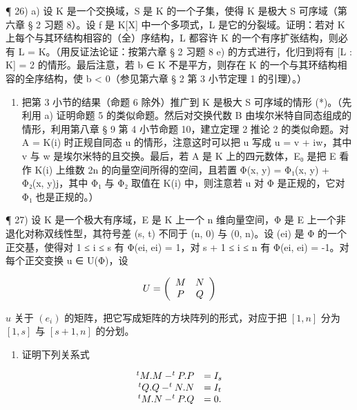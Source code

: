 ¶ 26) a) 设 K 是一个交换域，S 是 K 的一个子集，使得 K 是极大 S 可序域（第六章 § 2 习题 8）。设 f 是 K{[}X{]} 中一个多项式，L 是它的分裂域。证明：若对 K 上每个与其环结构相容的（全）序结构，L 都容许 K 的一个有序扩张结构，则必有 L = K。（用反证法论证：按第六章 § 2 习题 8 e) 的方式进行，化归到将有 {[}L : K{]} = 2 的情形。最后注意，若 b ∈ K 不是平方，则存在 K 的一个与其环结构相容的全序结构，使 b \textless{} 0（参见第六章 § 2 第 3 小节定理 1 的引理）。）

\begin{enumerate}
\def\labelenumi{\alph{enumi})}
\setcounter{enumi}{1}
\tightlist
\item
  把第 3 小节的结果（命题 6 除外）推广到 K 是极大 S 可序域的情形 (*)。（先利用 a) 证明命题 5 的类似命题。然后对交换代数 B 由埃尔米特自同态组成的情形，利用第八章 § 9 第 4 小节命题 10，建立定理 2 推论 2 的类似命题。对 A = K(i) 时正规自同态 u 的情形，注意这时可以把 u 写成 u = v + iw，其中 v 与 w 是埃尔米特的且交换。最后，若 A 是 K 上的四元数体，E₀ 是把 E 看作 K(i) 上维数 2n 的向量空间所得的空间，且若置 Φ(x, y) = Φ₁(x, y) + Φ₂(x, y)j，其中 Φ₁ 与 Φ₂ 取值在 K(i) 中，则注意若 u 对 Φ 是正规的，它对 Φ₁ 也是正规的。）
\end{enumerate}

¶ 27) 设 K 是一个极大有序域，E 是 K 上一个 n 维向量空间，Φ 是 E 上一个非退化对称双线性型，其符号差 (s, t) 不同于 (n, 0) 与 (0, n)。设 (ei) 是 Φ 的一个正交基，使得对 1 ≤ i ≤ s 有 Φ(ei, ei) = 1，对 s + 1 ≤ i ≤ n 有 Φ(ei, ei) = -1。对每个正交变换 u ∈ U(Φ)，设

\[
U = \left( \begin{array}{c c} M & N \\ P & Q \end{array} \right)
\]

\(u\) 关于 \((e_{i})\) 的矩阵，把它写成矩阵的方块阵列的形式，对应于把 \([1, n]\) 分为 \([1, s]\) 与 \([s + 1, n]\) 的分划。

\begin{enumerate}
\def\labelenumi{\alph{enumi})}
\tightlist
\item
  证明下列关系式
\end{enumerate}

\[
\begin{array}{r l} ^ {t} M. M - ^ {t} P. P & = I _ {s} \\ ^ {t} Q. Q - ^ {t} N. N & = I _ {t} \\ ^ {t} M. N - ^ {t} P. Q & = 0. \end{array}
\]


